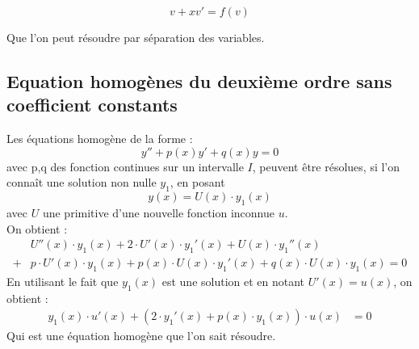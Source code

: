 \documentclass[12pt,a4paper]{report}
\begin{document}
$$v + xv' = f(v)$$

Que l'on peut résoudre par séparation des variables.\\
\subsection{Equation homogènes du deuxième ordre sans coefficient constants}
Les équations homogène de la forme :
$$y''+p(x)y'+q(x)y=0$$
avec p,q des fonction continues sur un intervalle $I$, peuvent être résolues, si l'on connaît une solution non nulle $y_1$, en posant
$$y(x) = U(x)\cdot y_1(x)$$
avec $U$ une primitive d'une nouvelle fonction inconnue $u$.\\
On obtient :
\begin{align*}
&U''(x) \cdot y_1(x)+ 2\cdot U'(x)\cdot y_1'(x)+U(x)\cdot y_1''(x)\\
+&p\cdot U'(x)\cdot y_1(x) + p(x) \cdot U(x) \cdot y_1'(x)+q(x)\cdot U(x) \cdot y_1(x) = 0
\end{align*}
En utilisant le fait que $y_1(x)$ est une solution et en notant $U'(x)=u(x)$, on obtient :
\begin{align*}
y_1(x) \cdot u'(x) + (2\cdot y_1'(x) + p(x)\cdot y_1(x))\cdot u(x) &= 0
\end{align*}
Qui est une équation homogène que l'on sait résoudre.

%
%
%
%
%
%
%
%
%
%
\end{document}
